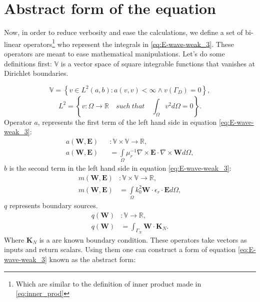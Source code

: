 \section{Abstract form of the equation}

Now, in order to reduce verbosity and ease the calculations, we define a set of bi-linear operators\footnote{Which are similar to the definition of inner product made in \ref{eq:inner_prod}} who represent the integrals in \ref{eq:E-wave-weak_3}. These operators are meant to ease mathematical manipulations. Let's do some definitions first:
$\mathbb{V}$ is a vector space of square integrable functions that vanishes at Dirichlet boundaries.

$$ \mathbb{V}=\left\lbrace v\in L^2(a,b):a(v,v)<\infty\wedge v(\Gamma_D)=0\right\rbrace,$$
$$L^2 =\left\lbrace v: \Omega \rightarrow \mathbb{R}\quad such \ that\quad \int_{\Omega}v^2d\Omega =0\right\rbrace.$$ 
Operator $a$, represents the first term of the left hand side in equation \ref{eq:E-wave-weak_3}:
\begin{equation}
\begin{array}{rcl}
      a(\mathbf{W},\mathbf{E})&&:\mathbb{V}\times \mathbb{V}\rightarrow \mathbb{R},\\
      a(\mathbf{W},\mathbf{E})&&= \int\limits_{\Omega}\mu_r^{-1}\nabla\times \mathbf{E}\cdot \nabla\times\mathbf{W} d\Omega,
\label{eq:a_def}
\end{array}
\end{equation}
$b$ is the second term in the left hand side in equation \ref{eq:E-wave-weak_3}:
\begin{equation}
\begin{array}{rcl}
      m(\mathbf{W},\mathbf{E})&:\mathbb{V}\times \mathbb{V}\rightarrow \mathbb{R},\\
      m(\mathbf{W},\mathbf{E})&= \int\limits_{\Omega} k_0^{2}\mathbf{W}\cdot \epsilon_r\cdot \mathbf{E} d\Omega,
\label{eq:m_def}
\end{array}
\end{equation}
$q$ represents boundary sources.
\begin{equation}
\begin{array}{rcl}
      q(\mathbf{W})&:\mathbb{V}\rightarrow \mathbb{R},\\
      q(\mathbf{W})&=\int_{\Gamma_N} \mathbf{W} \cdot\mathbf{K}_N.
\label{eq:m_def}
\end{array}
\end{equation}
Where $\mathbf{K}_N$ is a are known boundary condition.
These operators take vectors as inputs and return scalars. Using them one can construct a form of equation \ref{eq:E-wave-weak_3} known as the abstract form:

